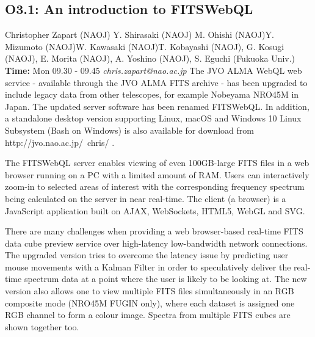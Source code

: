 \documentclass{report}
\begin{document}
\subsection*{O3.1: An introduction to FITSWebQL}
\bigskip
Christopher Zapart (NAOJ) \newline Y. Shirasaki (NAOJ) \newline  M. Ohishi (NAOJ)\newline  Y. Mizumoto (NAOJ)\newline W. Kawasaki (NAOJ)\newline  T. Kobayashi (NAOJ), G. Kosugi (NAOJ), E. Morita (NAOJ), A. Yoshino (NAOJ), S. Eguchi (Fukuoka Univ.)\newline\newline
{\bf Time:} Mon 09.30 - 09.45\newline
\newline
{\it chris.zapart@nao.ac.jp}\newline
\newline\newline
The JVO ALMA WebQL web service - available through the JVO ALMA FITS archive - has been upgraded to include legacy data from other telescopes, for example Nobeyama NRO45M in Japan. The updated server software has been renamed FITSWebQL. In addition, a standalone desktop version supporting Linux, macOS and Windows 10 Linux Subsystem (Bash on Windows) is also available for download from http://jvo.nao.ac.jp/~chris/ .

The FITSWebQL server enables viewing of even 100GB-large FITS files in a web browser running on a PC with a limited amount of RAM. Users can interactively zoom-in to selected areas of interest with the corresponding frequency spectrum being calculated on the server in near real-time. The client (a browser) is a JavaScript application built on AJAX, WebSockets, HTML5, WebGL and SVG.

There are many challenges when providing a web browser-based real-time FITS data cube preview service over high-latency low-bandwidth network connections. The upgraded version tries to overcome the latency issue by predicting user mouse movements with a Kalman Filter in order to speculatively deliver the real-time spectrum data at a point where the user is likely to be looking at. The new version also allows one to view multiple FITS files simultaneously in an RGB composite mode (NRO45M FUGIN only), where each dataset is assigned one RGB channel to form a colour image. Spectra from multiple FITS cubes are shown together too.
\end{document}
